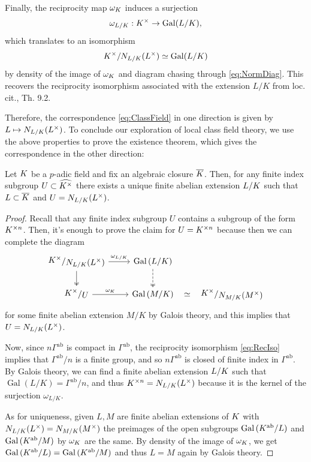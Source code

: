 \documentclass[a4paper, oneside]{memoir}
\begin{document}
\begin{remark}
	Finally, the reciprocity map $\omega_K$ induces a surjection
	\[
		\omega_{L/K}:K^\times \to \operatorname{Gal}(L/K),
	\]
	which translates to an isomorphism \[K^\times / N_{L/K}(L^\times) \simeq \operatorname{Gal}(L/K)\]
	by density of the image of $\omega_K$ and diagram chasing through \eqref{eq:NormDiag}.
	This recovers the reciprocity isomorphism associated with the extension $L/K$ from loc. cit., Th. 9.2.
\end{remark}

Therefore, the correspondence \eqref{eq:ClassField} in one direction is given by $L \mapsto N_{L/K}(L^\times)$. To conclude our exploration of local class field theory, we use the above properties to prove the existence theorem, which gives the correspondence in the other direction:

\begin{theorem}
	Let $K$ be a $p$-adic field and fix an algebraic closure $\overline{K}$. Then, for any finite index subgroup $U\subset\widehat{K^\times}$
	there exists a unique finite abelian extension $L / K$ such that $L \subset \overline{K}$ and $U=N_{L/K}(L^\times)$.
\end{theorem}

\begin{proof}
	Recall that any finite index subgroup $U$ contains a subgroup of the form $K^{\times n}$. Then, it's enough to prove the claim for $U=K^{\times n}$ because then we can complete the diagram
	\[
		\begin{tikzcd}
			\ssfrac{\K^\times}{N_{L/\K}(L^\times)} \ar[r, "\omega_{L/\K}"] \ar[d, twoheadrightarrow] & \operatorname{Gal}{(L/K)} \ar[d, dashed, twoheadrightarrow] &\\
			\ssfrac{\K^\times}{U} \ar[r, "\omega_K"] & \operatorname{Gal}{(M/K)}\ar[r, phantom, "\simeq"] &\ssfrac{\K^\times}{N_{M/\K}(M^\times)}
		\end{tikzcd}
	\]
	for some finite abelian extension $M/K$ by Galois theory, and this implies that $U=N_{L/K}(L^\times)$.

	Now, since $n\Gamma^{\text{ab}}$ is compact in $\Gamma^{\text{ab}}$, the reciprocity isomorphism \eqref{eq:RecIso} implies that $\Gamma^{\text{ab}}/n$ is a finite group, and so $n\Gamma^{\text{ab}}$ is closed of finite index in $\Gamma^{\text{ab}}$. By Galois theory, we can find a finite abelian extension $L/K$ such that $\operatorname{Gal}{(L/K)}=\Gamma^{\text{ab}}/n$, and thus $K^{\times n}=N_{L/K}(L^\times)$ because it is the kernel of the surjection $\omega_{L/K}$.

	As for uniqueness, given $L,M$ are finite abelian extensions of $K$ with $N_{L/K}(L^\times)=N_{M/K}(M^\times)$ the preimages of the open subgroups $\operatorname{Gal}{(K^\text{ab}/L)}$ and $\operatorname{Gal}{(K^\text{ab}/M)}$ by $\omega_K$ are the same. By density of the image of $\omega_K$, we get $\operatorname{Gal}{(K^\text{ab}/L)}=\operatorname{Gal}{(K^\text{ab}/M)}$ and thus $L=M$ again by Galois theory.
\end{proof}

\nocite{*}
\printbibliography
\end{document}

